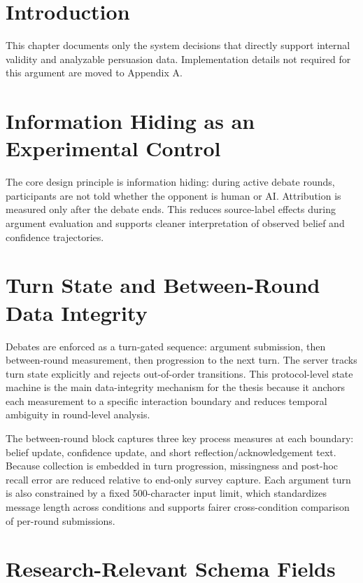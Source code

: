 
\section{Introduction}

This chapter documents only the system decisions that directly support internal
validity and analyzable persuasion data. Implementation details not required for
this argument are moved to Appendix A.

\section{Information Hiding as an Experimental Control}

The core design principle is information hiding: during active debate rounds,
participants are not told whether the opponent is human or AI. Attribution is
measured only after the debate ends. This reduces source-label effects during
argument evaluation and supports cleaner interpretation of observed belief and
confidence trajectories.

\section{Turn State and Between-Round Data Integrity}

Debates are enforced as a turn-gated sequence: argument submission, then
between-round measurement, then progression to the next turn. The server tracks
turn state explicitly and rejects out-of-order transitions. This protocol-level
state machine is the main data-integrity mechanism for the thesis because it
anchors each measurement to a specific interaction boundary and reduces temporal
ambiguity in round-level analysis.

The between-round block captures three key process measures at each boundary:
belief update, confidence update, and short reflection/acknowledgement text.
Because collection is embedded in turn progression, missingness and post-hoc
recall error are reduced relative to end-only survey capture.
Each argument turn is also constrained by a fixed 500-character input limit,
which standardizes message length across conditions and supports fairer
cross-condition comparison of per-round submissions.

\section{Research-Relevant Schema Fields}

